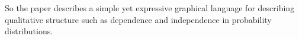 %
%
%
%
So the paper
describes a simple yet expressive graphical
    language for describing qualitative
    structure such as dependence and independence
    in probability distributions.

